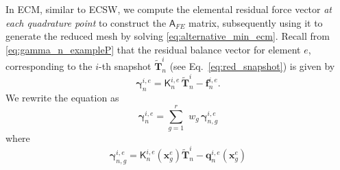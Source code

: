 \documentclass[11pt]{article}
\renewcommand{\vec}[1]{\mathbf{#1}}
\newcommand{\mat}[1]{\mathsf{#1}}
\begin{document}
            In ECM, similar to ECSW, we compute the elemental residual force vector \textit{at each quadrature point} to construct the $\mat{A}_{FE}$ matrix, subsequently using it to generate the reduced mesh by solving \cref{eq:alternative_min_ecm}.
            Recall from \cref{eq:gamma_n_exampleP} that the residual balance vector for element $e$, corresponding to the $i$-th snapshot $\widetilde{\vec{T}}^i_n$ (see Eq.~\ref{eq:red_snapshot}) is given by
            \begin{equation}
                \boldsymbol{\gamma}^{i,e}_{n} = \mat{K}^{i,e}_n \,\widetilde{\vec{T}}^i_n - \vec{f}^{i,e}_n.
            \end{equation}
            We rewrite the equation as
            \begin{equation}
                \boldsymbol{\gamma}^{i,e}_{n} = \sum_{g=1}^{r}\,\,w_g\,\boldsymbol{\gamma}^{i,e}_{n,g}
            \end{equation}
            where
            \begin{equation}
                \boldsymbol{\gamma}^{i,e}_{n,g} = \mat{K}_n^{i,e}(\vec{x}^e_g)\widetilde{\vec{T}}^i_n - \vec{q}_n^{i,e}(\vec{x}^e_g)
            \end{equation}
\end{document}

